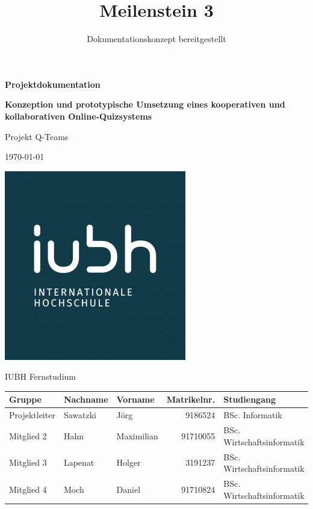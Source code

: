 \documentclass[a4paper,11pt,listof=numbered,glossary=totoc,parskip=half,toc=bib]{scrreprt}
\title{Meilenstein 3}
\subtitle{Dokumentationskonzept bereitgestellt}
\begin{document}
	\begin{titlepage}
		
		\centering
		\vspace*{2.5cm}
		{\large\bfseries \par}	
		{\Huge\bfseries Projektdokumentation\par}
		{\Large\bfseries Konzeption und prototypische Umsetzung eines kooperativen und kollaborativen Online‐Quizsystems \par}

		{\Large Projekt Q-Teams\par}
		{\large\today\par}
		\vspace{0.5cm}

			
		
		\includegraphics[scale=0.5]{iubh_logo}
		
		IUBH Fernstudium
		\vspace{0.5cm}
		
		\begin{tabular}{lllrl}
			\toprule
			\textbf{Gruppe} & \textbf{Nachname} & \textbf{Vorname} & \textbf{Matrikelnr.} & \textbf{Studiengang} \\
			\midrule
			Projektleiter & Sawatzki & Jörg & 9186524 & BSc. Informatik \\
			Mitglied 2 & Hahn & Maximilian & 91710055 & BSc. Wirtschaftsinformatik \\
			Mitglied 3 & Lapenat & Holger & 3191237 & BSc. Wirtschaftsinformatik \\
			Mitglied 4 & Moch & Daniel & 91710824 & BSc. Wirtschaftsinformatik \\
			\bottomrule
		\end{tabular}	
	\end{titlepage}
	
\end{document}
